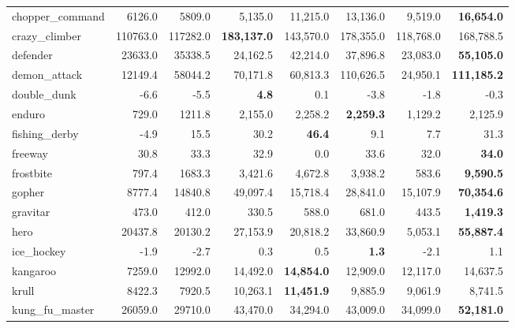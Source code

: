 \documentclass[letterpaper]{article} \usepackage{aaai18}  \usepackage{times}  \usepackage{helvet}  \usepackage{courier}  \usepackage{url}  \usepackage{graphicx}  \usepackage{amsmath,amssymb}
\begin{document}
\begin{table*}[t]
{\begin{tabular}{l|rrrrrrr}
   chopper\_command &    6126.0 &    5809.0 &     5,135.0 &   11,215.0 &       13,136.0 &    9,519.0 &  {\bf  16,654.0 }\\
     crazy\_climber &  110763.0 &  117282.0 &  {\bf  183,137.0} &  143,570.0 &      178,355.0 &  118,768.0 &  168,788.5 \\
          defender &   23633.0 &   35338.5 &    24,162.5 &   42,214.0 &       37,896.8 &   23,083.0 &  {\bf  55,105.0} \\
      demon\_attack &   12149.4 &   58044.2 &    70,171.8 &   60,813.3 &      110,626.5 &   24,950.1 & {\bf  111,185.2} \\
       double\_dunk &      -6.6 &      -5.5 &       {\bf   4.8} &        0.1 &           -3.8 &       -1.8 &       -0.3 \\
            enduro &     729.0 &    1211.8 &     2,155.0 &    2,258.2 &      {\bf   2,259.3 }&    1,129.2 &    2,125.9 \\
     fishing\_derby &      -4.9 &      15.5 &        30.2 &      {\bf  46.4} &            9.1 &        7.7 &       31.3 \\
           freeway &      30.8 &      33.3 &        32.9 &        0.0 &           33.6 &       32.0 &       {\bf 34.0} \\
         frostbite &     797.4 &    1683.3 &     3,421.6 &    4,672.8 &        3,938.2 &      583.6 &   {\bf  9,590.5 }\\
            gopher &    8777.4 &   14840.8 &    49,097.4 &   15,718.4 &       28,841.0 &   15,107.9 &  {\bf  70,354.6} \\
          gravitar &     473.0 &     412.0 &       330.5 &      588.0 &          681.0 &      443.5 &   {\bf  1,419.3} \\
              hero &   20437.8 &   20130.2 &    27,153.9 &   20,818.2 &       33,860.9 &    5,053.1 &  {\bf  55,887.4} \\
        ice\_hockey &      -1.9 &      -2.7 &         0.3 &        0.5 &           {\bf  1.3 }&       -2.1 &        1.1 \\
          kangaroo &    7259.0 &   12992.0 &    14,492.0 &   {\bf 14,854.0 }&       12,909.0 &   12,117.0 &   14,637.5 \\
             krull &    8422.3 &    7920.5 &    10,263.1 &   {\bf 11,451.9} &        9,885.9 &    9,061.9 &    8,741.5 \\
    kung\_fu\_master &   26059.0 &   29710.0 &    43,470.0 &   34,294.0 &       43,009.0 &   34,099.0 &  {\bf  52,181.0 }\\

\end{tabular}}
\end{table*}
\end{document}
